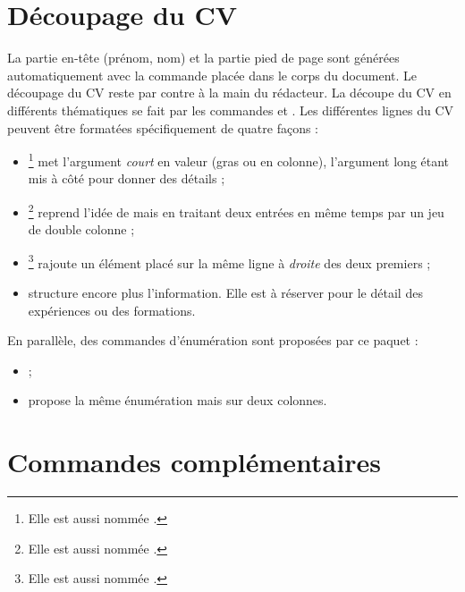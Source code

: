 \section{Découpage du CV}

La partie en-tête (prénom, nom) et la partie pied de page sont générées automatiquement avec la commande  placée dans le corps du document. Le découpage du CV reste par contre à la main du rédacteur. La découpe du CV en différents thématiques se fait par les commandes  et . Les différentes lignes du CV peuvent être formatées spécifiquement de quatre façons :
\begin{itemize}
\item {}\footnote{Elle est aussi nommée .} met l'argument \emph{court} en valeur (gras ou en colonne), l'argument long étant mis à côté pour donner des détails ; 
\item {}\footnote{Elle est aussi nommée .} reprend l'idée de  mais en traitant deux entrées en même temps par un jeu de double colonne ;
\item {}\footnote{Elle est aussi nommée .} rajoute un élément placé sur la même ligne à \emph{droite} des deux premiers ;
\item {} structure encore plus l'information. Elle est à réserver pour le détail des expériences ou des formations. \\
\end{itemize}

En parallèle, des commandes d'énumération sont proposées par ce paquet :
\begin{itemize}
\item {} ;
\item {} propose la même énumération mais sur deux colonnes.
\end{itemize}


\section{Commandes complémentaires}

